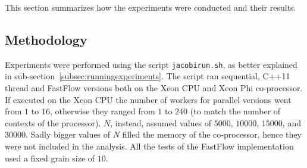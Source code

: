 This section summarizes how the experiments were conducted and their results.

\subsection{Methodology} \label{subsec:methodology}
Experiments were performed using the script \verb|jacobirun.sh|, as better explained in sub-section~\ref{subsec:runningexperiments}.
The script ran sequential, C++11 thread and FastFlow versions both on the Xeon CPU and Xeon Phi co-processor.
If executed on the Xeon CPU the number of workers for parallel versions went from $1$ to $16$, otherwise they ranged from $1$ to $240$ (to match the number of contexts of the processor).
$N$, instead, assumed values of $5000$, $10000$, $15000$, and $30000$. 
Sadly bigger values of $N$ filled the memory of the co-processor, hence they were not included in the analysis.
All the tests of the FastFlow implementation used a fixed grain size of $10$.

